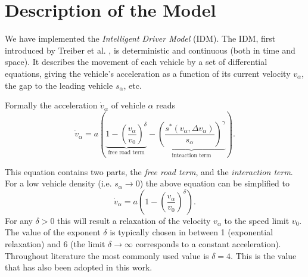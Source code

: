 \section{Description of the Model}
We have implemented the \emph{Intelligent Driver Model} (IDM). The IDM, first introduced by Treiber et al. \cite{treiber1999, treiber2000}, is deterministic and continuous (both in time and space). It describes the movement of each vehicle by a set of differential equations, giving the vehicle's acceleration as a function of its current velocity $v_\alpha$, the gap to the leading vehicle $s_\alpha$, etc. 

Formally the acceleration $\dot v_\alpha$ of vehicle $\alpha$ reads 
\begin{equation}
\dot v_\alpha = a\left(\underbrace{1-\left(\frac{v_\alpha}{v_0}\right)^\delta}_{\text{free road term}} - \underbrace{\left(\frac{s^*(v_\alpha, \Delta v_\alpha)}{s_\alpha}\right)^\gamma}_{\text{inteaction term}}\right).
\label{eq:IDM}
\end{equation}


This equation contains two parts, the \emph{free road term}, and the \emph{interaction term}. For a low vehicle density (i.e. $s_\alpha \rightarrow 0$) the above equation can be simplified to
\begin{equation}
\dot v_\alpha = a\left(1-\left(\frac{v_\alpha}{v_0}\right)^\delta\right).
\end{equation}
For any $\delta>0$ this will result a relaxation of the velocity $v_\alpha$ to the speed limit $v_0$. The value of the exponent $\delta$ is typically chosen in between 1 (exponential relaxation) and 6 (the limit $\delta\rightarrow \infty$ corresponds to a constant acceleration). Throughout literature the most commonly used value is $\delta=4$. This is the value that has also been adopted in this work.

